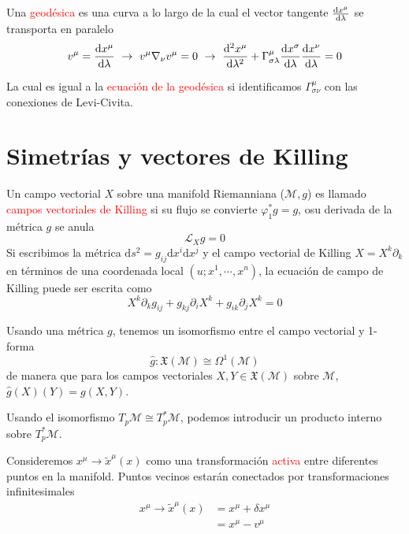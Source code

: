 \documentclass[../main]{subfiles}
\begin{document}
Una \textcolor{red}{geodésica} es una curva a lo largo de la cual el vector tangente $\dv{x^{\mu}}{\lambda}$ se transporta en paralelo 
\begin{equation}
    v^{\mu}=\dv{x^{\mu}}{\lambda} \ \rightarrow \ v^{\mu}\nabla_{\nu}v^{\mu}=0 \ \rightarrow \ \dv{^2 x^{\mu}}{\lambda^2}+\Gamma^{\mu}_{\sigma\lambda}\dv{x^{\sigma}}{\lambda}\dv{x^{\nu}}{\lambda}=0
\end{equation}

La cual es igual a la \textcolor{red}{ecuación de la geodésica} si identificamos $\Gamma^{\mu}_{\sigma\nu}$ con las conexiones de Levi-Civita.

\section{Simetrías y vectores de Killing}

Un campo vectorial $X$ sobre una manifold Riemanniana ($\mathcal{M}, g$) es llamado \textcolor{red}{campos vectoriales de Killing} si su flujo se convierte $\varphi^*_1 g=g$, osu derivada de la métrica $g$ se anula
\begin{equation}
    \mathcal{L}_X g=0
\end{equation}
Si escribimos la métrica $\mathrm{d}s^2=g_{ij}\mathrm{d}x^{i}\mathrm{d}x^j$ y el campo vectorial de Killing $X=X^k\partial_{k}$ en términos de una coordenada local $(u; x^1, \cdots, x^n)$, la ecuación de campo de Killing puede ser escrita como 
\begin{equation}
    X^k \partial_k g_{ij}+g_{kj}\partial_i X^k+g_{ik}\partial_j X^k=0
\end{equation}

Usando una métrica $g$, tenemos un isomorfismo entre el campo vectorial y 1-forma 
\begin{equation}
    \hat{g}: \mathfrak{X}(\mathcal{M}) \cong \Omega^1(\mathcal{M})
\end{equation}
de manera que para los campos vectoriales $X, Y \in \mathfrak{X}(\mathcal{M})$ sobre $\mathcal{M}$, $\hat{g}(X)(Y)=g(X, Y)$.

Usando el isomorfismo $T_p \mathcal{M} \cong T^*_p \mathcal{M}$, podemos introducir un producto interno sobre $T^*_p\mathcal{M}$.

Consideremos $x^{\mu} \rightarrow \tilde{x}^{\mu}(x)$ como una transformación \textcolor{red}{activa} entre diferentes puntos en la manifold. Puntos vecinos estarán conectados por transformaciones infinitesimales
\begin{equation}
    \begin{split}
        x^{\mu} \rightarrow \tilde{x}^{\mu}(x)&=x^{\mu}+\delta x^{\mu}\\
        &=x^{\mu}-v^{\mu}
    \end{split}
\end{equation} 
\end{document}
